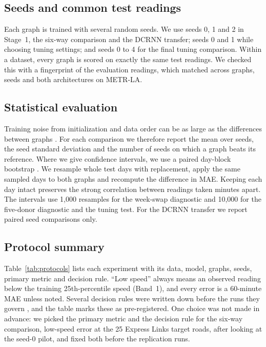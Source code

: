 \documentclass[journal]{IEEEtran}
\begin{document}
\subsection{Seeds and common test readings}
Each graph is trained with several random seeds. We use seeds 0, 1 and 2 in Stage~1, the six-way comparison and the DCRNN transfer; seeds 0 and 1 while choosing tuning settings; and seeds 0 to 4 for the final tuning comparison. Within a dataset, every graph is scored on exactly the same test readings. We checked this with a fingerprint of the evaluation readings, which matched across graphs, seeds and both architectures on METR-LA.

\subsection{Statistical evaluation}
Training noise from initialization and data order can be as large as the differences between graphs \cite{bouthillier2021variance}. For each comparison we therefore report the mean over seeds, the seed standard deviation and the number of seeds on which a graph beats its reference. Where we give confidence intervals, we use a paired day-block bootstrap \cite{efron1979,kunsch1989}. We resample whole test days with replacement, apply the same sampled days to both graphs and recompute the difference in MAE. Keeping each day intact preserves the strong correlation between readings taken minutes apart. The intervals use 1{,}000 resamples for the week-swap diagnostic and 10{,}000 for the five-donor diagnostic and the tuning test. For the DCRNN transfer we report paired seed comparisons only.

\subsection{Protocol summary}
Table~\ref{tab:protocols} lists each experiment with its data, model, graphs, seeds, primary metric and decision rule. ``Low speed'' always means an observed reading below the training 25th-percentile speed (Band~1), and every error is a 60-minute MAE unless noted. Several decision rules were written down before the runs they govern \cite{nosek2018preregistration}, and the table marks these as pre-registered. One choice was not made in advance: we picked the primary metric and the decision rule for the six-way comparison, low-speed error at the 25 Express Links target roads, after looking at the seed-0 pilot, and fixed both before the replication runs.
\end{document}
